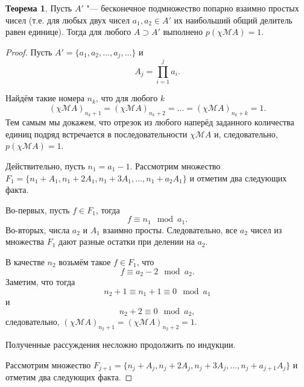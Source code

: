\documentclass[a4paper,openbib]{article}
\theoremstyle{definition}
\newtheorem{theorem}[lemma]{Теорема}
\begin{document}
\begin{theorem}
	\label{lem:ac0_primes_infinity_mutually_prime_subset}
	Пусть $A'$ "--- бесконечное подмножество попарно взаимно простых чисел
	(т.е. для любых двух чисел $a_1, a_2 \in A'$ их наибольший общий делитель равен единице).
	Тогда для любого $A \supset A' $ выполнено $p(\chi\mathscr{M}A)=1$.
\end{theorem}
\begin{proof}
	Пусть $A' = \{ a_1, a_2, ..., a_j, ... \}$ и
	\begin{equation}
		\label{eq:ac0_primes_A_j_prod_des}
		A_j = \prod_{i=1}^j a_i
		.
	\end{equation}

	Найдём такие номера $n_k$, что для любого $k$
	\begin{equation}
		(\chi\mathscr{M}A)_{n_k+1} = (\chi\mathscr{M}A)_{n_k+2} = \dots = (\chi\mathscr{M}A)_{n_k+k} = 1
		.
	\end{equation}
	Тем самым мы докажем, что отрезок из любого наперёд заданного количества единиц подряд
	встречается в последовательности $\chi\mathscr{M}A$ и, следовательно, $p(\chi\mathscr{M}A) = 1$.

	Действительно,
	пусть $n_1 = a_1 - 1$.
	Рассмотрим множество  $F_1 = \{ n_1 + A_1, n_1 + 2A_1, n_1 + 3A_1, \dots, n_1 + a_2A_1 \}$
	и отметим два следующих факта.

	Во-первых, пусть $f \in F_1$,
	тогда
	\begin{equation}
		f \equiv n_1 \mod a_1
		.
	\end{equation}
	Во-вторых, числа $a_2$ и $A_1$ взаимно просты.
	Следовательно, все $a_2$ чисел из множества $F_1$ дают разные остатки при делении на $a_2$.

	В качестве $n_2$ возьмём такое $f\in F_1$, что
	\begin{equation}
		f \equiv a_2 - 2 \mod a_2
		.
	\end{equation}
	Заметим, что тогда
	\begin{equation}
		n_2 + 1 \equiv n_1 + 1 \equiv 0 \mod a_1
	\end{equation}
	и
	\begin{equation}
		n_2 + 2 \equiv 0 \mod a_2
		,
	\end{equation}
	следовательно,
	$(\chi\mathscr{M}A)_{n_2 + 1} = (\chi\mathscr{M}A)_{n_2 + 2} = 1$.

	Полученные рассуждения несложно продолжить по индукции.

	Рассмотрим множество  $F_{j+1} = \{ n_j + A_j, n_j + 2A_j, n_j + 3A_j, \dots, n_j + a_{j+1}A_j \}$
	и отметим два следующих факта.


\end{proof}
\end{document}
